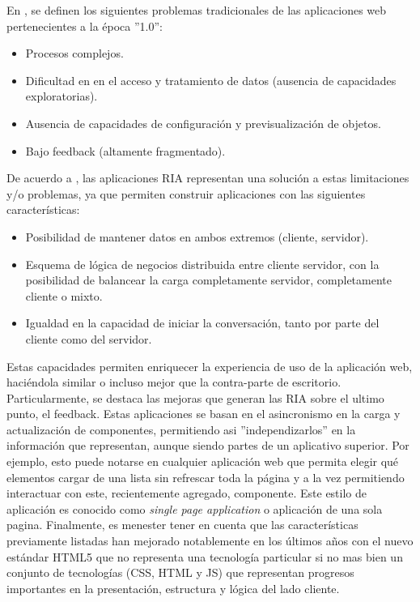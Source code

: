 En \citet{Duhl2003}, se definen los siguientes problemas tradicionales de las aplicaciones web pertenecientes a la época ''1.0'':
\begin{itemize}
\item Procesos complejos.
\item Dificultad en en el acceso y tratamiento de datos (ausencia de capacidades exploratorias).
\item Ausencia de capacidades de configuración y previsualización de objetos.
\item Bajo feedback (altamente fragmentado).
\end{itemize}
De acuerdo a  \citet{Fraternali2010}, las aplicaciones RIA representan una solución a estas limitaciones y/o problemas, ya que permiten construir aplicaciones con las siguientes características:
\begin{itemize}
\item Posibilidad de mantener datos en ambos extremos (cliente, servidor).
\item Esquema de lógica de negocios distribuida entre cliente servidor, con la posibilidad de balancear la carga completamente servidor, completamente cliente o mixto.
\item Igualdad en la capacidad de iniciar la conversación, tanto por parte del cliente como del servidor.
\end{itemize}
Estas capacidades permiten enriquecer la experiencia de uso de la aplicación web, haciéndola similar o incluso mejor que la contra-parte de escritorio. Particularmente, se destaca las mejoras que generan las RIA sobre el ultimo punto, el feedback. Estas aplicaciones se basan en el asincronismo en la carga y actualización de componentes, permitiendo asi ''independizarlos'' en la información que representan, aunque siendo partes de un aplicativo superior. Por ejemplo, esto puede notarse en cualquier aplicación web que permita elegir qué elementos cargar de una lista sin refrescar toda la página y a la vez permitiendo interactuar con este, recientemente agregado, componente. Este estilo de aplicación es conocido como \emph{single page application} o aplicación de una sola pagina.
Finalmente, es menester tener en cuenta que las características previamente listadas han mejorado notablemente en los últimos años con el nuevo estándar HTML5 que no representa una tecnología particular si no mas bien un conjunto de tecnologías (CSS, HTML y JS) que representan progresos importantes en la presentación, estructura y lógica del lado cliente.

